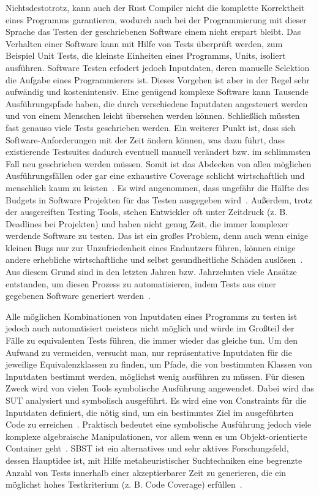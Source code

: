 \documentclass{article}
\begin{document}
Nichtsdestotrotz, kann auch der Rust Compiler nicht die komplette Korrektheit eines Programms garantieren, wodurch auch bei der Programmierung mit dieser Sprache das Testen der geschriebenen Software einem nicht erspart bleibt. Das Verhalten einer Software kann mit Hilfe von Tests überprüft werden, zum Beispiel Unit Tests, die kleinste Einheiten eines Programms, Units, isoliert ausführen. Software Testen erfodert jedoch Inputdaten, deren manuelle Selektion die Aufgabe eines Programmierers ist. Dieses Vorgehen ist aber in der Regel sehr aufwändig und kostenintensiv. Eine genügend komplexe Software kann Tausende Ausführungspfade haben, die durch verschiedene Inputdaten angesteuert werden und von einem Menschen leicht übersehen werden können. Schließlich müssten fast genauso viele Tests geschrieben werden. Ein weiterer Punkt ist, dass sich Software-Anforderungen mit der Zeit ändern können, was dazu führt, dass existierende Testsuites dadurch eventuell manuell verändert bzw. im schlimmsten Fall neu geschrieben werden müssen. Somit ist das Abdecken von allen möglichen Ausführungsfällen oder gar eine exhaustive Coverage schlicht wirtschaftlich und menschlich kaum zu leisten~\cite{Myers2012}. Es wird angenommen, dass ungefähr die Hälfte des Budgets in Software Projekten für das Testen ausgegeben wird~\cite{Beizer2003}. Außerdem, trotz der ausgereiften Testing Tools, stehen Entwickler oft unter Zeitdruck (z. B. Deadlines bei Projekten) und haben nicht genug Zeit, die immer komplexer werdende Software zu testen. Das ist ein großes Problem, denn auch wenn einige kleinen Bugs nur zur Unzufriedenheit eines Endnutzers führen, können einige andere erhebliche wirtschaftliche und selbst gesundheitliche Schäden auslösen~\cite{Myers2012}.  Aus diesem Grund sind in den letzten Jahren bzw. Jahrzehnten viele Ansätze entstanden, um diesen Prozess zu automatisieren, indem Tests aus einer gegebenen Software generiert werden~\cite{McMinn_2004}. 

Alle möglichen Kombinationen von Inputdaten eines Programms zu testen ist jedoch auch automatisiert meistens nicht möglich und würde im Großteil der Fälle zu equivalenten Tests führen, die immer wieder das gleiche tun. Um den Aufwand zu vermeiden, versucht man, nur repräsentative Inputdaten für die jeweilige Equivalenzklassen zu finden, um Pfade, die von bestimmten Klassen von Inputdaten bestimmt werden, möglichst wenig ausführen zu müssen. Für diesen Zweck wird von vielen Tools symbolische Ausführung angewendet. Dabei wird das \ac{SUT} analysiert und symbolisch ausgeführt. Es wird eine von Constraints für die Inputdaten definiert, die nötig sind, um ein bestimmtes Ziel im ausgeführten Code zu erreichen~\cite{Clarke1976}. Praktisch bedeutet eine symbolische Ausführung jedoch viele komplexe algebraische Manipulationen, vor allem wenn es um Objekt-orientierte Container geht~\cite{Korel1990}. \ac{SBST} ist ein alternatives und sehr aktives Forschungsfeld, dessen Hauptidee ist, mit Hilfe metaheuristischer Suchtechniken eine begrenzte Anzahl von Tests innerhalb einer akzeptierbarer Zeit zu generieren, die ein möglichst hohes Testkriterium (z. B. Code Coverage) erfüllen~\cite{McMinn_2004}. 
\end{document}
